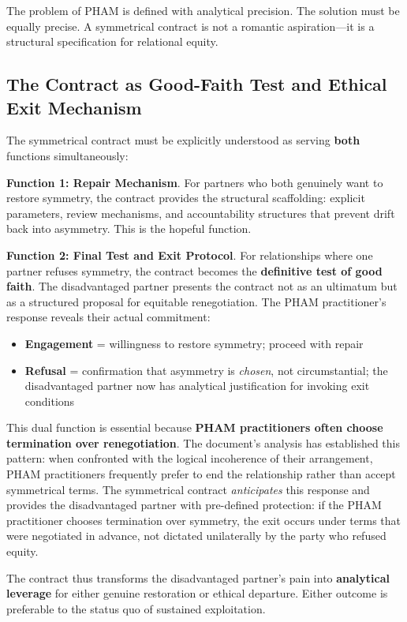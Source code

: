 \documentclass[12pt,openany]{book}
\numberwithin{equation}{chapter}
\begin{document}
The problem of PHAM is defined with analytical precision. The solution must be equally precise. A symmetrical contract is not a romantic aspiration---it is a structural specification for relational equity.

\subsection{The Contract as Good-Faith Test and Ethical Exit Mechanism}

The symmetrical contract must be explicitly understood as serving \textbf{both} functions simultaneously:

\textbf{Function 1: Repair Mechanism}. For partners who both genuinely want to restore symmetry, the contract provides the structural scaffolding: explicit parameters, review mechanisms, and accountability structures that prevent drift back into asymmetry. This is the hopeful function.

\textbf{Function 2: Final Test and Exit Protocol}. For relationships where one partner refuses symmetry, the contract becomes the \textbf{definitive test of good faith}. The disadvantaged partner presents the contract not as an ultimatum but as a structured proposal for equitable renegotiation. The PHAM practitioner's response reveals their actual commitment:

\begin{itemize}
    \item \textbf{Engagement} = willingness to restore symmetry; proceed with repair
    \item \textbf{Refusal} = confirmation that asymmetry is \textit{chosen}, not circumstantial; the disadvantaged partner now has analytical justification for invoking exit conditions
\end{itemize}

This dual function is essential because \textbf{PHAM practitioners often choose termination over renegotiation}. The document's analysis has established this pattern: when confronted with the logical incoherence of their arrangement, PHAM practitioners frequently prefer to end the relationship rather than accept symmetrical terms. The symmetrical contract \textit{anticipates} this response and provides the disadvantaged partner with pre-defined protection: if the PHAM practitioner chooses termination over symmetry, the exit occurs under terms that were negotiated in advance, not dictated unilaterally by the party who refused equity.

The contract thus transforms the disadvantaged partner's pain into \textbf{analytical leverage} for either genuine restoration or ethical departure. Either outcome is preferable to the status quo of sustained exploitation.
\end{document}
